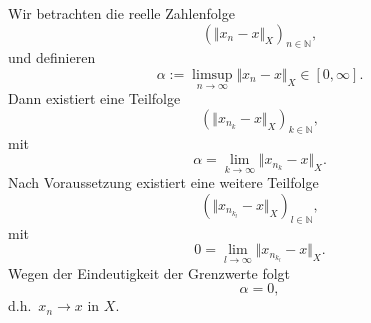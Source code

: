 \documentclass{article}
\begin{document}
Wir betrachten die reelle Zahlenfolge
\begin{equation*}
  \left(\Vert x_n - x \Vert_X\right)_{n \in \mathbb{N}},
\end{equation*}
und definieren
\begin{equation*}
  \alpha := \limsup_{n \rightarrow \infty} \Vert x_n - x \Vert_X
  \in [0, \infty].
\end{equation*}
Dann existiert eine Teilfolge
\begin{equation*}
  \left(\Vert x_{n_k} - x \Vert_X\right)_{k \in \mathbb{N}},
\end{equation*}
mit
\begin{equation*}
  \alpha = \lim_{k \rightarrow \infty} \Vert x_{n_k} - x \Vert_X.
\end{equation*}
Nach Voraussetzung existiert eine weitere Teilfolge
\begin{equation*}
  \left(\Vert x_{n_{k_l}} - x \Vert_X\right)_{l \in \mathbb{N}},
\end{equation*}
mit
\begin{equation*}
  0 = \lim_{l \rightarrow \infty} \Vert x_{n_{k_l}} - x \Vert_X.
\end{equation*}
Wegen der Eindeutigkeit der Grenzwerte folgt
\begin{equation*}
  \alpha = 0,
\end{equation*}
d.h.\ $x_n \rightarrow x$ in $X$.
\end{document}
